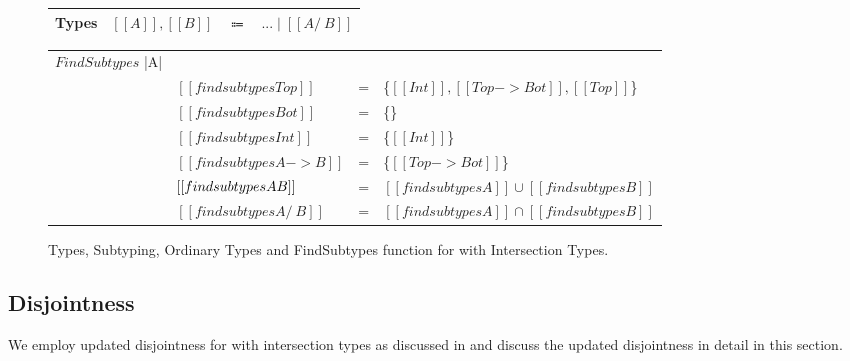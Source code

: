 \begin{figure}[t]
  \begin{small}
    \centering
    \begin{tabular}{lrcl} \toprule
      Types & $[[A]], [[B]]$ & $\Coloneqq$ & $ ... \mid [[A /\ B]] $ \\
      \bottomrule
    \end{tabular}
  \end{small}
  \medskip
    \begin{small}
    \centering
  \end{small}
  \medskip
    \begin{small}
    \centering
  \end{small}
  \medskip
    \centering
    \begin{tabular}{llcl}
      \toprule
      $FindSubtypes$ |A| &  & & \\
     & $[[findsubtypes Top]]$ & = & \{$ [[Int]], [[Top -> Bot]], [[Top]] $\}  \\
     & $[[findsubtypes Bot]]$ & = & \{\}  \\
     & $[[findsubtypes Int]]$ & = & \{$ [[Int]] $\}  \\
     & $[[findsubtypes A -> B]]$ & = & \{$ [[Top -> Bot]] $\}  \\
     & $[[findsubtypes A \/ B]]$ & = & $ [[findsubtypes A]] \cup [[findsubtypes B]] $\\
     & $[[findsubtypes A /\ B]]$ & = & $ [[findsubtypes A]] \cap [[findsubtypes B]] $\\
      \bottomrule
    \end{tabular}
  \caption{Types, Subtyping, Ordinary Types and FindSubtypes function for \cal with Intersection Types.}
  \label{fig:inter:system}
\end{figure}

\subsection{Disjointness}
\label{sec:inter:disj}
We employ updated disjointness for \cal with intersection types as discussed in 
and discuss the updated disjointness in detail in this section.

